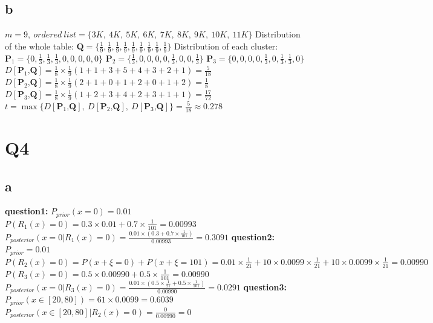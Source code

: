 \documentclass[12pt]{article}
\begin{document}
\subsection{b}
$m=9,\ ordered\ list=\{3K,\ 4K,\ 5K,\ 6K,\ 7K,\ 8K,\ 9K,\ 10K,\ 11K\}$
\newline
Distribution of the whole table:
\newline
$\textbf{Q}=\{\frac{1}{9},\frac{1}{9},\frac{1}{9},\frac{1}{9},\frac{1}{9},\frac{1}{9},\frac{1}{9},\frac{1}{9},\frac{1}{9} \}$
\newline
Distribution of each cluster:
\newline
$\textbf{P}_1=\{0,\frac{1}{3},\frac{1}{3},\frac{1}{3},0,0,0,0,0\}$
\newline
$\textbf{P}_2=\{\frac{1}{3},0,0,0,0, \frac{1}{3},0,0,\frac{1}{3}\}$
\newline
$\textbf{P}_3=\{0,0,0,0,\frac{1}{3},0,\frac{1}{3},\frac{1}{3},0\}$
\newline
$D[\textbf{P$_1$,Q}]=\frac{1}{8}\times\frac{1}{9}(1+1+3+5+4+3+2+1)=\frac{5}{18}$
\newline
$D[\textbf{P$_2$,Q}]=\frac{1}{8}\times\frac{1}{9}(2+1+0+1+2+0+1+2)=\frac{1}{8}$
\newline
$D[\textbf{P$_3$,Q}]=\frac{1}{8}\times\frac{1}{9}(1+2+3+4+2+3+1+1)=\frac{17}{72}$
\newline
$t=\max\{D[\textbf{P$_1$,Q}],\ D[\textbf{P$_2$,Q}],\ D[\textbf{P$_3$,Q}]\}=\frac{5}{18}\approx0.278$

\section{Q4}
\subsection{a}
\textbf{question1:}
\newline
$P_{prior}(x=0)=0.01$
\newline
$P(R_1(x)=0)=0.3\times0.01+0.7\times\frac{1}{101}=0.00993$
\newline
$P_{posterior}(x=0|R_1(x)=0)=\frac{0.01\times(0.3+0.7\times\frac{1}{101})}{0.00993}=0.3091$
\newline
\textbf{question2:}
\newline
$P_{prior}=0.01$
\newline
$P(R_2(x)=0)=P(x+\xi=0)+P(x+\xi=101)=0.01\times\frac{1}{21}+10\times0.0099\times\frac{1}{21}+10\times0.0099\times\frac{1}{21}=0.00990$
\newline
$P(R_3(x)=0)=0.5\times0.00990+0.5\times\frac{1}{101}=0.00990$
\newline
$P_{posterior}(x=0|R_3(x)=0)=\frac{0.01\times(0.5\times\frac{1}{21}+0.5\times\frac{1}{101})}{0.00990}=0.0291$
\newline
\textbf{question3:}
\newline
$P_{prior}(x\in [20,80])=61\times0.0099=0.6039$
\newline
$P_{posterior}(x\in [20,80]|R_2(x)=0)=\frac{0}{0.00990}=0$
\end{document}
